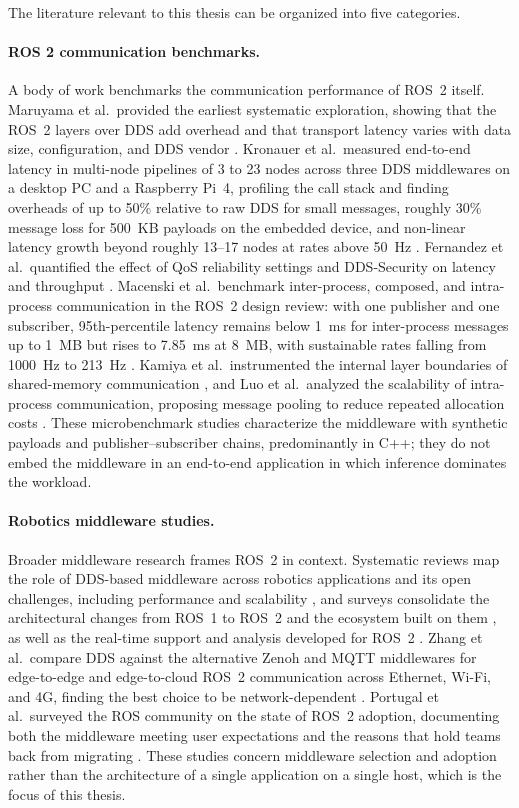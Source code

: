 The literature relevant to this thesis can be organized into five
categories.

\paragraph{ROS 2 communication benchmarks.}
A body of work benchmarks the communication performance of ROS~2 itself.
Maruyama et al.\ provided the earliest systematic exploration, showing
that the ROS~2 layers over DDS add overhead and that transport latency
varies with data size, configuration, and DDS vendor \cite{maruyama2016}.
Kronauer et al.\ measured end-to-end latency in multi-node pipelines of 3
to 23 nodes across three DDS middlewares on a desktop PC and a Raspberry
Pi~4, profiling the call stack and finding overheads of up to 50\% relative
to raw DDS for small messages, roughly 30\% message loss for 500~KB
payloads on the embedded device, and non-linear latency growth beyond
roughly 13--17 nodes at rates above 50~Hz \cite{kronauer2021}. Fernandez
et al.\ quantified the effect of QoS reliability settings and DDS-Security
on latency and throughput \cite{fernandez2020}. Macenski et al.\
benchmark inter-process, composed, and intra-process communication in the
ROS~2 design review: with one publisher and one subscriber, 95th-percentile
latency remains below 1~ms for inter-process messages up to 1~MB but rises
to 7.85~ms at 8~MB, with sustainable rates falling from 1000~Hz to
213~Hz \cite{macenski2022}. Kamiya et al.\ instrumented the internal
layer boundaries of shared-memory communication \cite{kamiya2025}, and
Luo et al.\ analyzed the scalability of intra-process communication,
proposing message pooling to reduce repeated allocation costs
\cite{luo2025}. These microbenchmark studies characterize the middleware
with synthetic payloads and publisher--subscriber chains, predominantly in
C++; they do not embed the middleware in an end-to-end application in
which inference dominates the workload.

\paragraph{Robotics middleware studies.}
Broader middleware research frames ROS~2 in context. Systematic reviews
map the role of DDS-based middleware across robotics applications and its
open challenges, including performance and scalability
\cite{gambo2025}, and surveys consolidate the architectural changes from
ROS~1 to ROS~2 and the ecosystem built on them \cite{al-batati2026}, as
well as the real-time support and analysis developed for ROS~2
\cite{casini2026}. Zhang et al.\ compare DDS against the alternative
Zenoh and MQTT middlewares for edge-to-edge and edge-to-cloud ROS~2
communication across Ethernet, Wi-Fi, and 4G, finding the best choice to
be network-dependent \cite{zhang2024}. Portugal et al.\ surveyed the ROS
community on the state of ROS~2 adoption, documenting both the middleware
meeting user expectations and the reasons that hold teams back from
migrating \cite{portugal2025}. These studies concern middleware selection
and adoption rather than the architecture of a single application on a
single host, which is the focus of this thesis.

